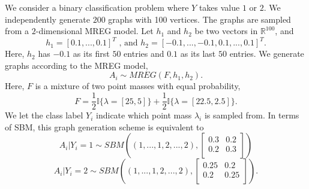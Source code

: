 \documentclass[10pt,journal,compsoc]{IEEEtran}
\begin{document}
\noindent We consider a binary classification problem where $Y$ takes value $1$ or $2$. We independently generate $200$ graphs with 100 vertices. The graphs are sampled from a $2$-dimensional MREG model. Let $h_1$ and $h_2$ be two vectors in $\mathbb{R}^{100}$, and \[h_1=[0.1,...,0.1]^T \text{ , and } h_2=[-0.1,...,-0.1,0.1,...,0.1]^T. \] 
Here, $h_2$ has $-0.1$ as its first $50$ entries and $0.1$ as its last $50$ entries. We generate graphs according to the MREG model, 
\begin{equation}
A_i \sim MREG(F,h_1,h_2).
\label{eq:simu}
\end{equation}
Here, $F$ is a mixture of two point masses with equal probability, 
\[ F = \frac{1}{2}\mathbb{I} \{\lambda=[25,5]\} + \frac{1}{2}\mathbb{I} \{\lambda=[22.5,2.5]\}.\]
We let the class label $Y_i$ indicate which point mass $\lambda_i$ is sampled from. In terms of SBM, this graph generation scheme is equivalent to 
\[ A_i|Y_i=1 \sim  SBM((1,...,1,2,...,2),\begin{bmatrix} 0.3 & 0.2 \\ 0.2 & 0.3 \\ \end{bmatrix})  \]
\[ A_i|Y_i=2 \sim  SBM((1,...,1,2,...,2),\begin{bmatrix} 0.25 & 0.2 \\ 0.2 & 0.25 \\ \end{bmatrix}).\]
\end{document}
